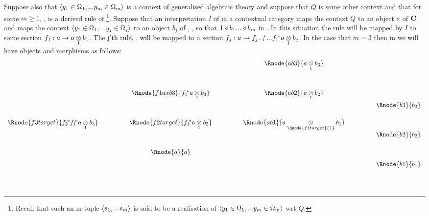 \begin{oldtt}
\label{omegarealisationwrtQ}
 Suppose also that $\encyOmega{m}$ is a context of generalised algebraic theory \gatUw and suppose that $Q$ is some other context and that for some $m \geq 1$,
 \foreachj,  is a derived rule of \gatU\footnote{Recall that such an m-tuple $\tuple{\sm}$ is said to be a realisation of 
$\encyOmega{m}$ wrt $Q$.}.  Suppose that an interpretation $I$ of \gatUw in a contextual category \catcw maps the context $Q$ to an object $a$  of $\catc$ and maps
the context $\encyOmega{j}$ to an object $b_j$ of \catc, \foreachj, so that $1 \base b_1 ... \base b_m$ in \catc. In this situation the rule 
 will be mapped by $I$ to some section $f_1:a \morph \crossx{a}{b_1}{1}$. The j'th rule,
, will be mapped to a section $f_j:a \morph \fjpstar ... \fonestar\crossx{a}{b_j}{1}$.
In the case that $m=3$  then in \catcw we will have objects and morphisms as follows:
\begin{displaymath}
\begin{array}{c p{1cm} c p {1cm} c  p{1cm} c}
                                                &&                                           && \Rnode{ab3}{\crossx{a}{b_3}{1}}                       \\[1.2cm]
                                                &&\Rnode{f1axb3}{\fonestar\crossx{a}{b_3}{1}}  && \Rnode{ab2}{\crossx{a}{b_2}{1}}                       \\[1.2cm]
 \Rnode{f3target}{\ftwostar\fonestar\crossx{a}{b_3}{1}} &&\Rnode{f2target}{\fonestar\crossx{a}{b_2}{1}}  && \Rnode{ab1}{\crossx{a}{b_1}{\Rnode{f1target}{1}}}     \\[1.2cm]
                                                &&\Rnode{a}{a}                               &&                                                       \\[-3.0cm]
																								&&                                           &&                         && \Rnode{b3}{b_3}             \\[1.2cm]
																								&&                                           &&                         && \Rnode{b2}{b_2}             \\[1.2cm]
																								&&                                           &&                         && \Rnode{b1}{b_1}             \\[1.1cm]

\end{array}
\end{displaymath}
\end{oldtt}
